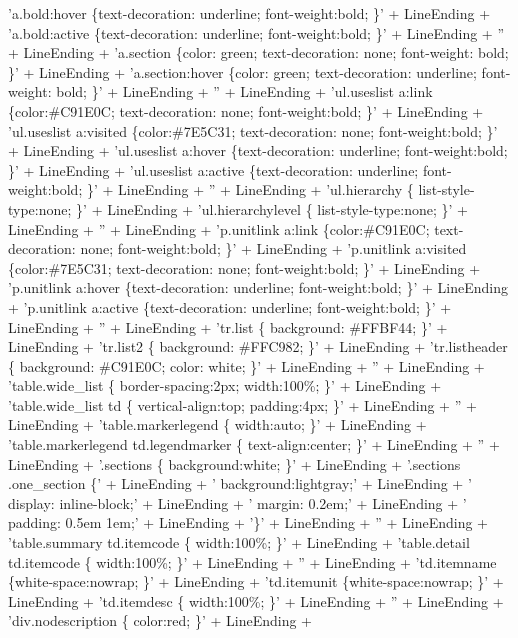 \documentclass{report}
\begin{document}
\begin{list}{}
\begin{flushleft}
\begin{ttfamily}
'a.bold:hover {\{}text-decoration: underline; font-weight:bold; {\}}' + LineEnding +
'a.bold:active {\{}text-decoration: underline; font-weight:bold; {\}}' + LineEnding +
'' + LineEnding +
'a.section {\{}color: green; text-decoration: none; font-weight: bold; {\}}' + LineEnding +
'a.section:hover {\{}color: green; text-decoration: underline; font-weight: bold; {\}}' + LineEnding +
'' + LineEnding +
'ul.useslist a:link {\{}color:{\#}C91E0C; text-decoration: none; font-weight:bold; {\}}' + LineEnding +
'ul.useslist a:visited {\{}color:{\#}7E5C31; text-decoration: none; font-weight:bold; {\}}' + LineEnding +
'ul.useslist a:hover {\{}text-decoration: underline; font-weight:bold; {\}}' + LineEnding +
'ul.useslist a:active {\{}text-decoration: underline; font-weight:bold; {\}}' + LineEnding +
'' + LineEnding +
'ul.hierarchy {\{} list-style-type:none; {\}}' + LineEnding +
'ul.hierarchylevel {\{} list-style-type:none; {\}}' + LineEnding +
'' + LineEnding +
'p.unitlink a:link {\{}color:{\#}C91E0C; text-decoration: none; font-weight:bold; {\}}' + LineEnding +
'p.unitlink a:visited {\{}color:{\#}7E5C31; text-decoration: none; font-weight:bold; {\}}' + LineEnding +
'p.unitlink a:hover {\{}text-decoration: underline; font-weight:bold; {\}}' + LineEnding +
'p.unitlink a:active {\{}text-decoration: underline; font-weight:bold; {\}}' + LineEnding +
'' + LineEnding +
'tr.list {\{} background: {\#}FFBF44; {\}}' + LineEnding +
'tr.list2 {\{} background: {\#}FFC982; {\}}' + LineEnding +
'tr.listheader {\{} background: {\#}C91E0C; color: white; {\}}' + LineEnding +
'' + LineEnding +
'table.wide{\_}list {\{} border-spacing:2px; width:100{\%}; {\}}' + LineEnding +
'table.wide{\_}list td {\{} vertical-align:top; padding:4px; {\}}' + LineEnding +
'' + LineEnding +
'table.markerlegend {\{} width:auto; {\}}' + LineEnding +
'table.markerlegend td.legendmarker {\{} text-align:center; {\}}' + LineEnding +
'' + LineEnding +
'.sections {\{} background:white; {\}}' + LineEnding +
'.sections .one{\_}section {\{}' + LineEnding +
'  background:lightgray;' + LineEnding +
'  display: inline-block;' + LineEnding +
'  margin: 0.2em;' + LineEnding +
'  padding: 0.5em 1em;' + LineEnding +
'{\}}' + LineEnding +
'' + LineEnding +
'table.summary td.itemcode {\{} width:100{\%}; {\}}' + LineEnding +
'table.detail td.itemcode {\{} width:100{\%}; {\}}' + LineEnding +
'' + LineEnding +
'td.itemname {\{}white-space:nowrap; {\}}' + LineEnding +
'td.itemunit {\{}white-space:nowrap; {\}}' + LineEnding +
'td.itemdesc {\{} width:100{\%}; {\}}' + LineEnding +
'' + LineEnding +
'div.nodescription {\{} color:red; {\}}' + LineEnding +

\end{ttfamily}
\end{flushleft}
\end{list}
\end{document}
